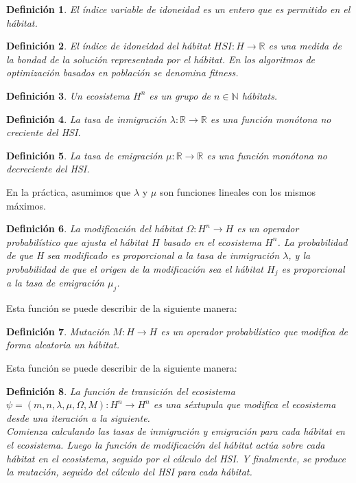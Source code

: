 \documentclass{article}
\newtheorem{mydef}{Definición}
\begin{document}
\begin{mydef}
    El índice variable de idoneidad es un entero que es permitido en el hábitat. 
\end{mydef}

\begin{mydef}
    El índice de idoneidad del hábitat $HSI: H \rightarrow \mathbb{R}$ es una medida de la bondad de la solución representada por el hábitat. En los algoritmos de optimización basados en población se denomina fitness.
\end{mydef}

\begin{mydef}
    Un ecosistema $H^{n}$ es un grupo de $n \in \mathbb{N}$ hábitats.
\end{mydef}

\begin{mydef}
    La tasa de inmigración $\lambda: \mathbb{R} \rightarrow \mathbb{R}$ es una función monótona no creciente del HSI.
\end{mydef}

\begin{mydef}
    La tasa de emigración $\mu: \mathbb{R} \rightarrow \mathbb{R}$ es una función monótona no decreciente del HSI.
\end{mydef}

En la práctica, asumimos que $\lambda$ y $\mu$ son funciones lineales con los mismos máximos.

\begin{mydef}
    La modificación del hábitat $\Omega: H^{n} \rightarrow H$ es un operador probabilístico que ajusta el hábitat $H$ basado en el 
    ecosistema $H^{n}$. 
    La probabilidad de que H sea modificado es proporcional a la tasa de inmigración $\lambda$, y la probabilidad de que el origen de 
    la modificación sea el hábitat $H_{j}$ es proporcional a la tasa de emigración $\mu_j$. 
\end{mydef}

    Esta función se puede describir de la siguiente manera:

\begin{mydef}
    Mutación $M: H \rightarrow H$ es un operador probabilístico que modifica de forma aleatoria un hábitat.
\end{mydef}

    Esta función se puede describir de la siguiente manera:

\begin{mydef}
    La función de transición del ecosistema $\psi = (m,n,\lambda,\mu,\Omega,M): H^{n} \rightarrow H^{n}$ es una 
    séxtupula que modifica el ecosistema desde una iteración a la siguiente. \\
    Comienza calculando las tasas de inmigración y emigración para cada hábitat en el ecosistema. Luego la función de modificación del hábitat 
    actúa sobre cada hábitat en el ecosistema, seguido por el cálculo del HSI. Y finalmente, se produce la mutación, seguido del cálculo del HSI 
    para cada hábitat.
\end{mydef}
\end{document}
